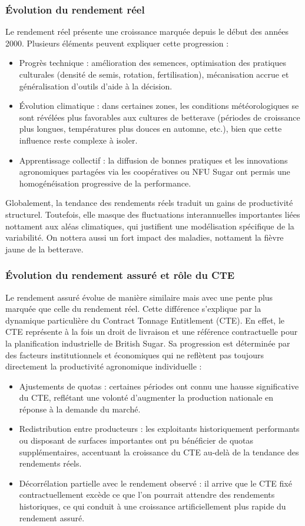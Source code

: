 \documentclass[11pt,a4paper,openright,twoside]{report}
\begin{document}
\subsubsection{Évolution du rendement réel}
Le rendement réel présente une croissance marquée depuis le début des années 2000. Plusieurs éléments peuvent expliquer cette progression :
\begin{itemize}
    \item Progrès technique : amélioration des semences, optimisation des pratiques culturales (densité de semis, rotation, fertilisation), mécanisation accrue et généralisation d’outils d’aide à la décision.
    \item Évolution climatique : dans certaines zones, les conditions météorologiques se sont révélées plus favorables aux cultures de betterave (périodes de croissance plus longues, températures plus douces en automne, etc.), bien que cette influence reste complexe à isoler.
    \item Apprentissage collectif : la diffusion de bonnes pratiques et les innovations agronomiques partagées via les coopératives ou NFU Sugar ont permis une homogénéisation progressive de la performance.
\end{itemize}
Globalement, la tendance des rendements réels traduit un gains de productivité structurel. Toutefois, elle masque des fluctuations interannuelles importantes liées nottament aux aléas climatiques, qui justifient une modélisation spécifique de la variabilité. On nottera aussi un fort impact des maladies, nottament la fièvre jaune de la betterave.

\subsubsection{Évolution du rendement assuré et rôle du CTE}
Le rendement assuré évolue de manière similaire mais avec une pente plus marquée que celle du rendement réel. Cette différence s’explique par la dynamique particulière du Contract Tonnage Entitlement (CTE).
En effet, le CTE représente à la fois un droit de livraison et une référence contractuelle pour la planification industrielle de British Sugar. Sa progression est déterminée par des facteurs institutionnels et économiques qui ne reflètent pas toujours directement la productivité agronomique individuelle :
\begin{itemize}
    \item Ajustements de quotas : certaines périodes ont connu une hausse significative du CTE, reflétant une volonté d’augmenter la production nationale en réponse à la demande du marché.
    \item Redistribution entre producteurs : les exploitants historiquement performants ou disposant de surfaces importantes ont pu bénéficier de quotas supplémentaires, accentuant la croissance du CTE au-delà de la tendance des rendements réels.
    \item Décorrélation partielle avec le rendement observé : il arrive que le CTE fixé contractuellement excède ce que l’on pourrait attendre des rendements historiques, ce qui conduit à une croissance artificiellement plus rapide du rendement assuré.
\end{itemize}
\end{document}

